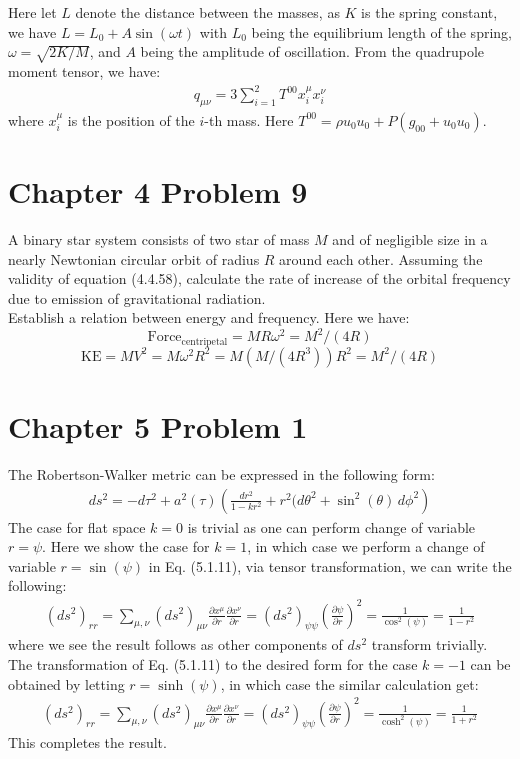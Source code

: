 \documentclass[11pt, onesided]{book}
\theoremstyle{break}
\theoremstyle{break}
\newcommand{\pd}{\partial}
\begin{document}
Here let $L$ denote the distance between the masses, as $K$ is the spring constant, we have $L = L_0 + A \sin(\omega t)$ with $L_0$ being the equilibrium length of the spring, $\omega = \sqrt{2K/M}$, and $A$ being the amplitude of oscillation. From the quadrupole moment tensor, we have:
\begin{align*}
q_{\mu\nu} = 3 \sum_{i=1}^2 T^{00} x^{\mu}_i x^{\nu}_i 
\end{align*}
where $x_i^{\mu}$ is the position of the $i$-th mass. Here $T^{00} = \rho u_0u_0 + P(g_{00} + u_0u_0)$.



\hfill\break\hfill\break\hfill\break
\section{Chapter 4 Problem 9}
A binary star system consists of two star of mass $M$ and of negligible size in a nearly Newtonian circular orbit of radius $R$ around each other. Assuming the validity of equation (4.4.58), calculate the rate of increase of the orbital frequency due to emission of gravitational radiation.\\

\color{red}
Establish a relation between energy and frequency. Here we have: 
$$\text{Force}_{\text{centripetal}} = MR\omega^2 = M^2/(4R)$$
$$\text{KE} = MV^2 = M\omega^2 R^2 = M(M/(4R^3)) R^2 =M^2 /(4R) $$
\color{black}




\newpage
\section{Chapter 5 Problem 1}
The Robertson-Walker metric can be expressed in the following form:
\begin{align*}
ds^2 = -d\tau^2 + a^2(\tau)\left( \frac{dr^2}{1-kr^2} + r^2(d\theta^2 + \sin^2(\theta)\, d\phi^2\right)
\end{align*}
The case for flat space $k=0$ is trivial as one can perform change of variable $r = \psi$. Here we show the case for $k=1$, in which case we perform a change of variable $r = \sin(\psi)$ in Eq. (5.1.11), via tensor transformation, we can write the following:
\begin{align*}
(ds^2)_{rr} = \sum_{\mu, \nu} (ds^2)_{\mu\nu}\frac{\pd x^{\mu}}{\pd r}\frac{\pd x^{\nu}}{\pd r} = (ds^2)_{\psi\psi}\left( \frac{\pd \psi}{\pd r}\right)^2 = \frac{1}{\cos^2(\psi)} = \frac{1}{1-r^2}
\end{align*}
where we see the result follows as other components of $ds^2$ transform trivially. The transformation of Eq. (5.1.11) to the desired form for the case $k=-1$ can be obtained by letting $r = \sinh(\psi)$, in which case the similar calculation get:
\begin{align*}
(ds^2)_{rr} = \sum_{\mu, \nu} (ds^2)_{\mu\nu}\frac{\pd x^{\mu}}{\pd r}\frac{\pd x^{\nu}}{\pd r} = (ds^2)_{\psi\psi}\left( \frac{\pd \psi}{\pd r}\right)^2 = \frac{1}{\cosh^2(\psi)} = \frac{1}{1+r^2}
\end{align*}
This completes the result. \\
\end{document}

